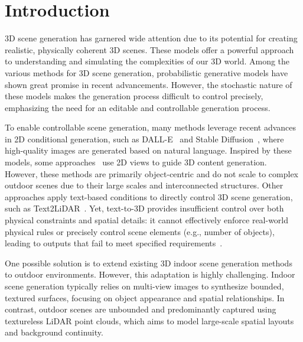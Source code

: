 \section{Introduction}
\label{sec:introduction}
3D scene generation has garnered wide attention due to its potential for creating realistic, physically coherent 3D scenes. These models offer a powerful approach to understanding and simulating the complexities of our 3D world. Among the various methods for 3D scene generation, probabilistic generative models have shown great promise in recent advancements. However, the stochastic nature of these models makes the generation process difficult to control precisely, emphasizing the need for an editable and controllable generation process.

To enable controllable scene generation,
%
many methods leverage recent advances in 2D conditional generation, such as DALL-E~\cite{betker2023improving} and Stable Diffusion~\cite{rombach2022high}, where high-quality images are generated based on natural language. Inspired by these models, some approaches~\cite{lin2023magic3d, liu2024isotropic3d, liu2024one} use 2D views to guide 3D content generation. However, these methods are primarily object-centric and do not scale to complex outdoor scenes due to their large scales and interconnected structures. Other approaches apply text-based conditions to directly control 3D scene generation, such as Text2LiDAR~\cite{wu2024text2lidar}. Yet, text-to-3D provides insufficient control over both physical constraints and spatial details: it cannot effectively enforce real-world physical rules or precisely control scene elements (e.g., number of objects), leading to outputs that fail to meet specified requirements~\cite{zhang2023adding}.

%


One possible solution is to extend existing 3D indoor scene generation methods~\cite{zhai2025echoscene, zhai2023commonscenes, wei2024planner3d, yang2025mmgdreamer, hu2024mixed} to outdoor environments.
%
However, this adaptation is highly challenging. Indoor scene generation typically relies on multi-view images to synthesize bounded, textured surfaces, focusing on object appearance and spatial relationships. In contrast, outdoor scenes are unbounded and predominantly captured using textureless LiDAR point clouds, 
which aims to model large-scale spatial layouts and background continuity.


